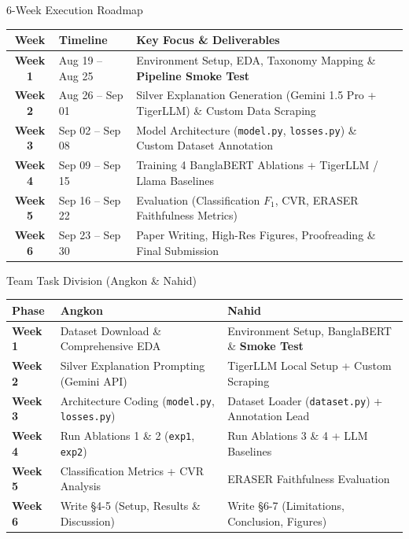 \documentclass[10pt, aspectratio=169]{beamer}
\begin{document}
\begin{frame}{6-Week Execution Roadmap}
    \begin{center}
        \small
        \begin{tabular}{cll}
            \toprule
            \textbf{Week} & \textbf{Timeline} & \textbf{Key Focus \& Deliverables} \\
            \midrule
            \textbf{Week 1} & Aug 19 -- Aug 25 & Environment Setup, EDA, Taxonomy Mapping \& \textbf{Pipeline Smoke Test} \\
            \textbf{Week 2} & Aug 26 -- Sep 01 & Silver Explanation Generation (Gemini 1.5 Pro + TigerLLM) \& Custom Data Scraping \\
            \textbf{Week 3} & Sep 02 -- Sep 08 & Model Architecture (\texttt{model.py}, \texttt{losses.py}) \& Custom Dataset Annotation \\
            \textbf{Week 4} & Sep 09 -- Sep 15 & Training 4 BanglaBERT Ablations + TigerLLM / Llama Baselines \\
            \textbf{Week 5} & Sep 16 -- Sep 22 & Evaluation (Classification $F_1$, CVR, ERASER Faithfulness Metrics) \\
            \textbf{Week 6} & Sep 23 -- Sep 30 & Paper Writing, High-Res Figures, Proofreading \& Final Submission \\
            \bottomrule
        \end{tabular}
    \end{center}
\end{frame}

\begin{frame}{Team Task Division (Angkon \& Nahid)}
    \begin{table}
        \centering
        \small
        \begin{tabular}{lp{5.5cm}p{5.5cm}}
            \toprule
            \textbf{Phase} & \textbf{Angkon} & \textbf{Nahid} \\
            \midrule
            \textbf{Week 1} & Dataset Download \& Comprehensive EDA & Environment Setup, BanglaBERT \& \textbf{Smoke Test} \\
            \textbf{Week 2} & Silver Explanation Prompting (Gemini API) & TigerLLM Local Setup + Custom Scraping \\
            \textbf{Week 3} & Architecture Coding (\texttt{model.py}, \texttt{losses.py}) & Dataset Loader (\texttt{dataset.py}) + Annotation Lead \\
            \textbf{Week 4} & Run Ablations 1 \& 2 (\texttt{exp1}, \texttt{exp2}) & Run Ablations 3 \& 4 + LLM Baselines \\
            \textbf{Week 5} & Classification Metrics + CVR Analysis & ERASER Faithfulness Evaluation \\
            \textbf{Week 6} & Write §4-5 (Setup, Results \& Discussion) & Write §6-7 (Limitations, Conclusion, Figures) \\
            \bottomrule
        \end{tabular}
    \end{table}
\end{frame}
\end{document}
